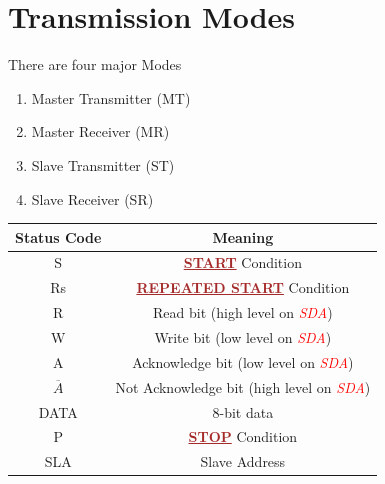 \documentclass{article}
\newcommand{\pinFormat}[1]{\emph{\textcolor{red}{#1}}}
\newcommand{\iicFormat}[1]{\textbf{\textcolor{brown}{\underline{#1}}}}
\begin{document}
\section{Transmission Modes}
\quad There are four major Modes
\begin{enumerate}[label=(\roman*)]
    \item Master Transmitter (MT)
    \item Master Receiver (MR)
    \item Slave Transmitter (ST)
    \item Slave Receiver (SR)
\end{enumerate}
\begin{table}[H]
    \begin{center}
        \begin{tabular}{c|c}
            \textbf{Status Code} & \textbf{Meaning}\\
            \hline
            S & \iicFormat{START} Condition\\
            Rs & \iicFormat{REPEATED START} Condition\\
            R & Read bit (high level on \pinFormat{SDA})\\
            W & Write bit (low level on \pinFormat{SDA})\\
            A & Acknowledge bit (low level on \pinFormat{SDA})\\
            $\overline{A}$ & Not Acknowledge bit (high level on \pinFormat{SDA})\\
            DATA & 8-bit data\\
            P & \iicFormat{STOP} Condition\\
            SLA & Slave Address\\
        \end{tabular}
    \end{center}
\end{table}
\end{document}

